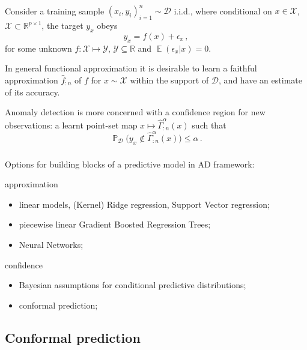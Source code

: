 \documentclass[t]{beamer}  %
\newcommand{\Ycal}{\mathcal{Y}}
\newcommand{\Dcal}{\mathcal{D}}
\newcommand{\Xcal}{\mathcal{X}}
\newcommand{\Real}{\mathbb{R}}
\newcommand{\ex}{\mathop{\mathbb{E}}\nolimits}
\newcommand{\pr}{\mathop{\mathbb{P}}\nolimits}
\begin{document}
\begin{frame}[c]\frametitle{\insertsection}
  \framesubtitle{\insertsubsection}
  \begin{block}{}
    Consider a training sample $(x_i, y_i)_{i=1}^n \sim \Dcal$ i.i.d., where conditional
    on $x\in \Xcal$, $\Xcal \subset \Real^{p\times 1}$, the target $y_x$ obeys
    $$ y_x = f(x) + \epsilon_x \,, $$
    for some unknown $f:\Xcal\mapsto \Ycal$, $\Ycal\subseteq \Real$ and $\ex(\epsilon_x|x) = 0$.

    In general functional approximation it is desirable to learn a faithful approximation
    $\hat{f}_{:n}$ of $f$ for $x\sim \Xcal$ within the support of $\Dcal$, and have an
    estimate of its accuracy.

    Anomaly detection is more concerned with a confidence region for new observations:
    a learnt point-set map $x \mapsto \hat{\Gamma}_{:n}^\alpha(x)$ such that
    $$ \pr_\Dcal\bigl(y_x \notin \hat{\Gamma}_{:n}^\alpha(x)\bigr) \leq \alpha \,. $$
  \end{block}
\end{frame}

\begin{frame}[c]\frametitle{\insertsection}
  \framesubtitle{\insertsubsection}
  Options for building blocks of a predictive model in AD framework: 
  \begin{block}{approximation}
    \begin{itemize}
      \item linear models, (Kernel) Ridge regression, Support Vector regression;
      \item piecewise linear Gradient Boosted Regression Trees;
      \item Neural Networks;
    \end{itemize}
  \end{block}
  \begin{block}{confidence}
      \begin{itemize}
        \item Bayesian assumptions for conditional predictive distributions;
        \item conformal prediction;
      \end{itemize}
  \end{block}
\end{frame}


\subsection{Conformal prediction} %
\label{sub:conformal_prediction}
\end{document}
